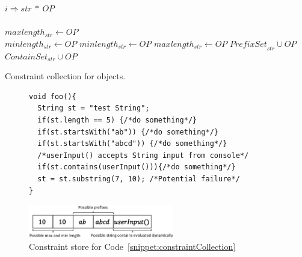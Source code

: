 \begin{algorithm}[t]
\scriptsize
\DontPrintSemicolon
{}
\Begin
{
  {
   $i \Rightarrow str\ *\ OP$ \\
    {\\
   \mytab $maxlength_{str} \longleftarrow OP$\\
   \mytab $minlength_{str} \longleftarrow OP$
   }  {
    $minlength_{str} \longleftarrow OP$
   }  {
    $maxlength_{str} \longleftarrow OP$
   }  {
    $\textit{PrefixSet}_{str} \cup OP$
   }  {
    $\textit{ContainSet}_{str} \cup OP$
   }
  }
}
\caption{Constraint collection for  objects.}
\label{algo:constraintCollection}
\end{algorithm}


\lstset{language=Java, caption=Static and dynamic constraint
collection example, label = snippet:constraintCollection, firstnumber =1}
\begin{figure}[t]
\begin{lstlisting}
void foo(){
  String st = "test String";
  if(st.length == 5) {/*do something*/}
  if(st.startsWith("ab")) {/*do something*/}
  if(st.startsWith("abcd")) {/*do something*/}
  /*userInput() accepts String input from console*/
  if(st.contains(userInput())){/*do something*/}
  st = st.substring(7, 10); /*Potential failure*/
}
\end{lstlisting}
\end{figure}


\begin{figure}[t]
\centering
\includegraphics[width=2.5in]{images/ConstraintExample.eps}
\caption{Constraint store for Code~\ref{snippet:constraintCollection}}
\label{fig:constraintExample}
\end{figure}

